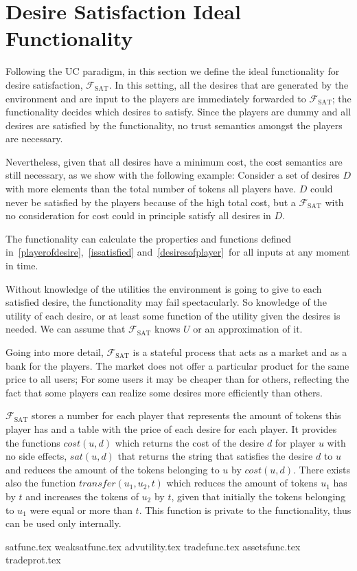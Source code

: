 \section{Desire Satisfaction Ideal Functionality}
  Following the UC paradigm, in this section we define the ideal functionality for desire
  satisfaction, $\mathcal{F}_{\mathrm{SAT}}$. In this setting, all the desires that are
  generated by the environment and are input to the players are immediately forwarded to
  $\mathcal{F}_{\mathrm{SAT}}$; the functionality decides which desires to satisfy. Since
  the players are dummy and all desires are satisfied by the functionality, no trust
  semantics amongst the players are necessary.

  Nevertheless, given that all desires have a minimum cost, the cost semantics are still
  necessary, as we show with the following example: Consider a set of desires $D$ with
  more elements than the total number of tokens all players have. $D$ could never be
  satisfied by the players because of the high total cost, but a
  $\mathcal{F}_{\mathrm{SAT}}$ with no consideration for cost could in principle satisfy
  all desires in $D$.

  The functionality can calculate the properties and functions defined
  in~\ref{playerofdesire},~\ref{issatisfied} and~\ref{desiresofplayer}\ for all inputs at
  any moment in time.

  Without knowledge of the utilities the environment is going to give to each satisfied
  desire, the functionality may fail spectacularly. So knowledge of the utility of each
  desire, or at least some function of the utility given the desires is needed. We can
  assume that $\mathcal{F}_{\mathrm{SAT}}$ knows $U$ or an approximation of it.

  Going into more detail, $\mathcal{F}_{\mathrm{SAT}}$ is a stateful process that acts as
  a market and as a bank for the players. The market does not offer a particular product
  for the same price to all users; For some users it may be cheaper than for others,
  reflecting the fact that some players can realize some desires more efficiently than
  others.

  $\mathcal{F}_{\mathrm{SAT}}$ stores a number for each player that represents the amount
  of tokens this player has and a table with the price of each desire for each player. It
  provides the functions $cost\left(u, d\right)$ which returns the cost of the desire $d$
  for player $u$ with no side effects, $sat\left(u, d\right)$ that returns the string that
  satisfies the desire $d$ to $u$ and reduces the amount of the tokens belonging to $u$ by
  $cost\left(u, d\right)$. There exists also the function $transfer\left(u_1, u_2,
  t\right)$ which reduces the amount of tokens $u_1$ has by $t$ and increases the tokens
  of $u_2$ by $t$, given that initially the tokens belonging to $u_1$ were equal or more
  than $t$. This function is private to the functionality, thus can be used only
  internally.

  {satfunc.tex}
  {weaksatfunc.tex}
  {advutility.tex}
  {tradefunc.tex}
  {assetsfunc.tex}
  {tradeprot.tex}
